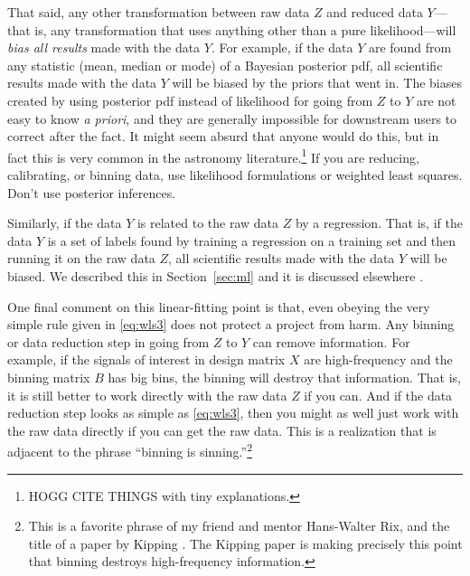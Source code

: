 \documentclass{article}
\newcommand{\sectionname}{Section}
\newcommand{\secref}[1]{\sectionname~\ref{#1}}
\newcommand{\foreign}[1]{\textsl{#1}}
\begin{document}
That said, any other transformation between raw data $Z$ and reduced data $Y$---that is, any transformation that uses anything other than a pure likelihood---will \emph{bias all results} made with the data $Y$.
For example, if the data $Y$ are found from any statistic (mean, median or mode) of a Bayesian posterior pdf, all scientific results made with the data $Y$ will be biased by the priors that went in.
The biases created by using posterior pdf instead of likelihood for going from $Z$ to $Y$ are not easy to know \foreign{a priori}, and they are generally impossible for downstream users to correct after the fact.
It might seem absurd that anyone would do this, but in fact this is very common in the astronomy literature.\footnote{HOGG CITE THINGS with tiny explanations.}
If you are reducing, calibrating, or binning data, use likelihood formulations or weighted least squares.
Don't use posterior inferences.

Similarly, if the data $Y$ is related to the raw data $Z$ by a regression.
That is, if the data $Y$ is a set of labels found by training a regression on a training set and then running it on the raw data $Z$, all scientific results made with the data $Y$ will be biased.
We described this in \secref{sec:ml} and it is discussed elsewhere \cite{goodorbad, ting}.

One final comment on this linear-fitting point is that, even obeying the very simple rule given in \eqref{eq:wls3} does not protect a project from harm.
Any binning or data reduction step in going from $Z$ to $Y$ can remove information.
For example, if the signals of interest in design matrix $X$ are high-frequency and the binning matrix $B$ has big bins, the binning will destroy that information.
That is, it is still better to work directly with the raw data $Z$ if you can.
And if the data reduction step looks as simple as \eqref{eq:wls3}, then you might as well just work with the raw data directly if you can get the raw data.
This is a realization that is adjacent to the phrase ``binning is sinning.''\footnote{This is a favorite phrase of my friend and mentor Hans-Walter Rix, and the title of a paper by Kipping \cite{binningissinning}. The Kipping paper is making precisely this point that binning destroys high-frequency information.}
\end{document}
